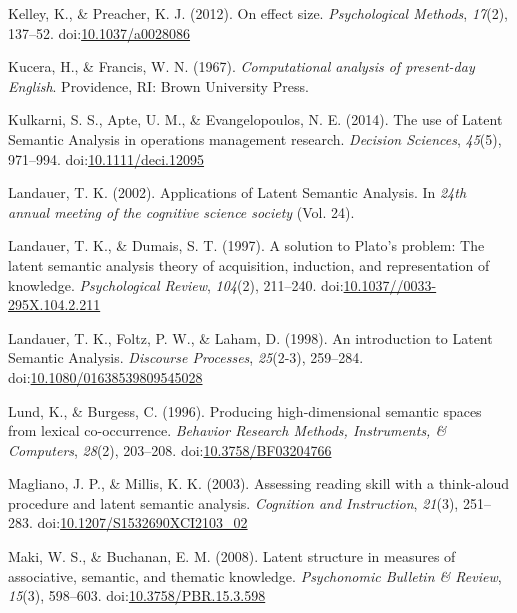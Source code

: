 \documentclass[english,man]{apa6}
\theoremstyle{definition}
\theoremstyle{definition}
\theoremstyle{definition}
\theoremstyle{remark}
\begin{document}
\hypertarget{ref-Kelley2012}{}
Kelley, K., \& Preacher, K. J. (2012). On effect size.
\emph{Psychological Methods}, \emph{17}(2), 137--52.
doi:\href{https://doi.org/10.1037/a0028086}{10.1037/a0028086}

\hypertarget{ref-Kucera1967}{}
Kucera, H., \& Francis, W. N. (1967). \emph{Computational analysis of
present-day English}. Providence, RI: Brown University Press.

\hypertarget{ref-Kulkarni2014}{}
Kulkarni, S. S., Apte, U. M., \& Evangelopoulos, N. E. (2014). The use
of Latent Semantic Analysis in operations management research.
\emph{Decision Sciences}, \emph{45}(5), 971--994.
doi:\href{https://doi.org/10.1111/deci.12095}{10.1111/deci.12095}

\hypertarget{ref-Landauer2002}{}
Landauer, T. K. (2002). Applications of Latent Semantic Analysis. In
\emph{24th annual meeting of the cognitive science society} (Vol. 24).

\hypertarget{ref-Landauer1997}{}
Landauer, T. K., \& Dumais, S. T. (1997). A solution to Plato's problem:
The latent semantic analysis theory of acquisition, induction, and
representation of knowledge. \emph{Psychological Review}, \emph{104}(2),
211--240.
doi:\href{https://doi.org/10.1037//0033-295X.104.2.211}{10.1037//0033-295X.104.2.211}

\hypertarget{ref-Landauer1998}{}
Landauer, T. K., Foltz, P. W., \& Laham, D. (1998). An introduction to
Latent Semantic Analysis. \emph{Discourse Processes}, \emph{25}(2-3),
259--284.
doi:\href{https://doi.org/10.1080/01638539809545028}{10.1080/01638539809545028}

\hypertarget{ref-Lund1996}{}
Lund, K., \& Burgess, C. (1996). Producing high-dimensional semantic
spaces from lexical co-occurrence. \emph{Behavior Research Methods,
Instruments, \& Computers}, \emph{28}(2), 203--208.
doi:\href{https://doi.org/10.3758/BF03204766}{10.3758/BF03204766}

\hypertarget{ref-Magliano2003}{}
Magliano, J. P., \& Millis, K. K. (2003). Assessing reading skill with a
think-aloud procedure and latent semantic analysis. \emph{Cognition and
Instruction}, \emph{21}(3), 251--283.
doi:\href{https://doi.org/10.1207/S1532690XCI2103_02}{10.1207/S1532690XCI2103\_02}

\hypertarget{ref-Maki2008}{}
Maki, W. S., \& Buchanan, E. M. (2008). Latent structure in measures of
associative, semantic, and thematic knowledge. \emph{Psychonomic
Bulletin \& Review}, \emph{15}(3), 598--603.
doi:\href{https://doi.org/10.3758/PBR.15.3.598}{10.3758/PBR.15.3.598}
\end{document}
